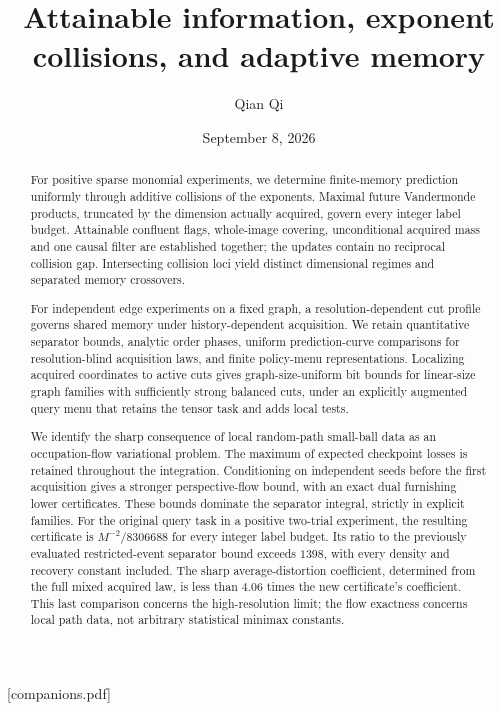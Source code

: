 
\providecommand{\upref}[2]{#1~\ref{#2}}
[companions.pdf]
\title[Attainable information and adaptive memory]{Attainable information, exponent collisions, and adaptive memory}
\author{Qian Qi}
\date{September 8, 2026}

\begin{abstract}
For positive sparse monomial experiments, we determine finite-memory
prediction uniformly through additive collisions of the exponents.
Maximal future Vandermonde products, truncated by the dimension actually
acquired, govern every integer label budget. Attainable confluent flags,
whole-image covering, unconditional acquired mass and one causal filter
are established together; the updates contain no reciprocal collision gap.
Intersecting collision loci yield distinct dimensional regimes and
separated memory crossovers.

For independent edge experiments on a fixed graph, a resolution-dependent
cut profile governs shared memory under history-dependent acquisition.
We retain quantitative separator bounds, analytic order phases, uniform
prediction-curve comparisons for resolution-blind acquisition laws, and
finite policy-menu representations. Localizing acquired coordinates to
active cuts gives graph-size-uniform bit bounds for linear-size graph
families with sufficiently strong balanced cuts, under an explicitly
augmented query menu that retains the tensor task and adds local tests.

We identify the sharp consequence of local random-path small-ball data
as an occupation-flow variational problem. The maximum of expected
checkpoint losses is retained throughout the integration. Conditioning
on independent seeds before the first acquisition gives a stronger
perspective-flow bound, with an exact dual furnishing lower certificates.
These bounds dominate the separator integral, strictly in explicit
families. For the original query task in a positive two-trial experiment,
the resulting certificate is $M^{-2}/8306688$ for every integer label
budget. Its ratio to the previously evaluated restricted-event
separator bound exceeds $1398$, with every density and recovery constant
included. The sharp average-distortion coefficient, determined from the
full mixed acquired law, is less than $4.06$ times the new certificate's
coefficient. This last comparison concerns the high-resolution limit;
the flow exactness concerns local path data, not arbitrary statistical
minimax constants.
\end{abstract}
